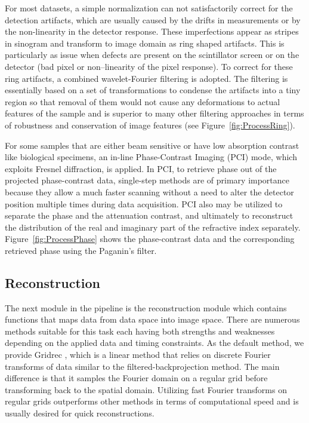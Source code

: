 \documentclass[pdf]{iucr}              %
\begin{document}
For most datasets, a simple normalization can not satisfactorily correct for the detection artifacts, which are usually caused by the drifts in measurements or by the non-linearity in the detector response. These imperfections appear as stripes in sinogram and transform to image domain as ring shaped artifacts. This is particularly as issue when defects are present on the scintillator screen or on the detector (bad pixel or non--linearity of the pixel response). To correct for these ring artifacts, a combined wavelet-Fourier filtering  \cite{Munch:09} is adopted. The filtering is essentially based on a set of transformations to condense the artifacts into a tiny region so that removal of them would not cause any deformations to actual features of the sample and is superior to many other filtering approaches in terms of robustness and conservation of image features (see Figure~\ref{fig:ProcessRing}).

For some samples that are either beam sensitive or have low absorption contrast like biological specimens, an in-line Phase-Contrast Imaging (PCI) mode, which exploits Fresnel diffraction, is applied. In PCI, to retrieve phase out of the projected phase-contrast data, single-step methods are of primary importance because they allow a much faster scanning without a need to alter the detector position multiple times during data acquisition. PCI also may be utilized to separate the phase and the attenuation contrast, and ultimately to reconstruct the distribution of the real and imaginary part of the refractive index separately. Figure~\ref{fig:ProcessPhase} shows the phase-contrast data and the corresponding retrieved phase using the Paganin's filter.


\subsection{Reconstruction}

The next module in the pipeline is the reconstruction module which contains functions that maps data from data space into image space. There are numerous methods suitable for this task each having both strengths and weaknesses depending on the applied data and timing constraints. As the default method, we provide Gridrec \cite{donath_spie_2006}, which is a linear method that relies on discrete Fourier transforms of data similar to the filtered-backprojection method. The main difference is that it samples the Fourier domain on a regular grid before transforming back to the spatial domain. Utilizing fast Fourier transforms on regular grids outperforms other methods in terms of computational speed and is usually desired for quick reconstructions.
\end{document}
